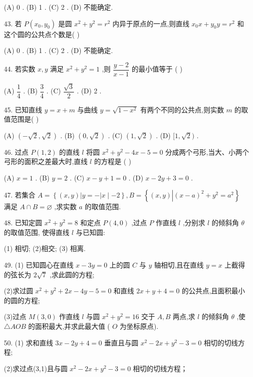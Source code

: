 (A) 0 . (B) 1 . (C) 2 . (D) 不能确定.

43. 若 $P\left( {{x}_{0},{y}_{0}}\right)$ 是圆 ${x}^{2} + {y}^{2} = {r}^{2}$ 内异于原点的一点,则直线 ${x}_{0}x + {y}_{0}y = {r}^{2}$ 和这个圆的公共点个数是(   )

(A) 0 . (B) 1 . (C) 2 . (D) 不能确定.

44. 若实数 $x,y$ 满足 ${x}^{2} + {y}^{2} = 1$ ,则 $\dfrac{y - 2}{x - 1}$ 的最小值等于 (   )

(A) $\dfrac{1}{4}$ . (B) $\dfrac{3}{4}$ . (C) $\dfrac{\sqrt{3}}{2}$ . (D) 2 .

45. 已知直线 $y = x + m$ 与曲线 $y = \sqrt{1 - {x}^{2}}$ 有两个不同的公共点,则实数 $m$ 的取值范围是(   )

(A) $\left( {-\sqrt{2},\sqrt{2}}\right)$ . (B) $\left( {0,\sqrt{2}}\right)$ . (C) $\left( {1,\sqrt{2}}\right)$ . (D) $\lbrack 1,\sqrt{2})$ .

46. 过点 $P\left( {1,2}\right)$ 的直线 $l$ 将圆 ${x}^{2} + {y}^{2} - {4x} - 5 = 0$ 分成两个弓形,当大、小两个弓形的面积之差最大时,直线 $l$ 的方程是 (   )

(A) $x = 1$ . (B) $y = 2$ . (C) $x - y + 1 = 0$ . (D) $x - {2y} + 3 = 0$ .

47. 若集合 $A = \left\{  {\left( {x,y}\right) \left| {y =  - }\right| x \mid   - 2}\right\}  ,B = \left\{  {\left( {x,y}\right) \left| {{\left( x - a\right) }^{2} + {y}^{2} = {a}^{2}}\right. }\right\}$ 满足 $A \cap  B = \varnothing$ ,求实数 $a$ 的取值范围.

48. 已知定圆 ${x}^{2} + {y}^{2} = 8$ 和定点 $P\left( {4,0}\right)$ ,过点 $P$ 作直线 $l$ ,分别求 $l$ 的倾斜角 $\theta$ 的取值范围, 使得直线 $l$ 与已知圆:

(1) 相切; (2)相交; (3) 相离.

49. (1) 已知圆心在直线 $x - {3y} = 0$ 上的圆 $C$ 与 $y$ 轴相切,且在直线 $y = x$ 上截得的弦长为 $2\sqrt{7}$ ,求此圆的方程;

(2)求过圆 ${x}^{2} + {y}^{2} + {2x} - {4y} - 5 = 0$ 和直线 ${2x} + y + 4 = 0$ 的公共点,且面积最小的圆的方程;

(3)过点 $M\left( {3,0}\right)$ 作直线 $l$ 与圆 ${x}^{2} + {y}^{2} = {16}$ 交于 $A,B$ 两点,求 $l$ 的倾斜角 $\theta$ ,使 $\bigtriangleup  {AOB}$ 的面积最大,并求此最大值 ( $O$ 为坐标原点).

50. (1) 求和直线 ${3x} - {2y} + 4 = 0$ 垂直且与圆 ${x}^{2} - {2x} + {y}^{2} - 3 = 0$ 相切的切线方程;

(2)求过点(3,1)且与圆 ${x}^{2} - {2x} + {y}^{2} - 3 = 0$ 相切的切线方程；

